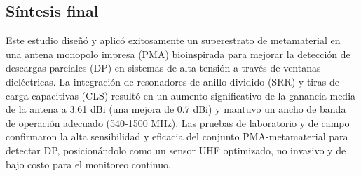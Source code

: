 \subsection*{Síntesis final}
Este estudio diseñó y aplicó exitosamente un superestrato de metamaterial en una antena monopolo impresa (PMA) bioinspirada para mejorar la detección de descargas parciales (DP) en sistemas de alta tensión a través de ventanas dieléctricas. La integración de resonadores de anillo dividido (SRR) y tiras de carga capacitivas (CLS) resultó en un aumento significativo de la ganancia media de la antena a 3.61 dBi (una mejora de 0.7 dBi) y mantuvo un ancho de banda de operación adecuado (540-1500 MHz). Las pruebas de laboratorio y de campo confirmaron la alta sensibilidad y eficacia del conjunto PMA-metamaterial para detectar DP, posicionándolo como un sensor UHF optimizado, no invasivo y de bajo costo para el monitoreo continuo.